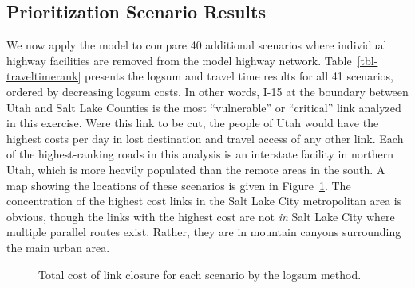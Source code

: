 \documentclass[
  letterpaper,
  number,
  review,
  3p]{elsarticle}
\begin{document}
\hypertarget{prioritization-scenario-results}{%
\subsection{Prioritization Scenario
Results}\label{prioritization-scenario-results}}

We now apply the model to compare 40 additional scenarios where
individual highway facilities are removed from the model highway
network. Table~\ref{tbl-traveltimerank} presents the logsum and travel
time results for all 41 scenarios, ordered by decreasing logsum costs.
In other words, I-15 at the boundary between Utah and Salt Lake Counties
is the most ``vulnerable'' or ``critical'' link analyzed in this
exercise. Were this link to be cut, the people of Utah would have the
highest costs per day in lost destination and travel access of any other
link. Each of the highest-ranking roads in this analysis is an
interstate facility in northern Utah, which is more heavily populated
than the remote areas in the south. A map showing the locations of these
scenarios is given in Figure~\ref{fig-linksmap}. The concentration of
the highest cost links in the Salt Lake City metropolitan area is
obvious, though the links with the highest cost are not \emph{in} Salt
Lake City where multiple parallel routes exist. Rather, they are in
mountain canyons surrounding the main urban area.

\begin{figure}

\begin{minipage}[t]{0.50\linewidth}

{\centering 


}

\end{minipage}%
%
\begin{minipage}[t]{0.50\linewidth}

{\centering 


}

\end{minipage}%

\caption{\label{fig-linksmap}Total cost of link closure for each
scenario by the logsum method.}

\end{figure}
\end{document}
